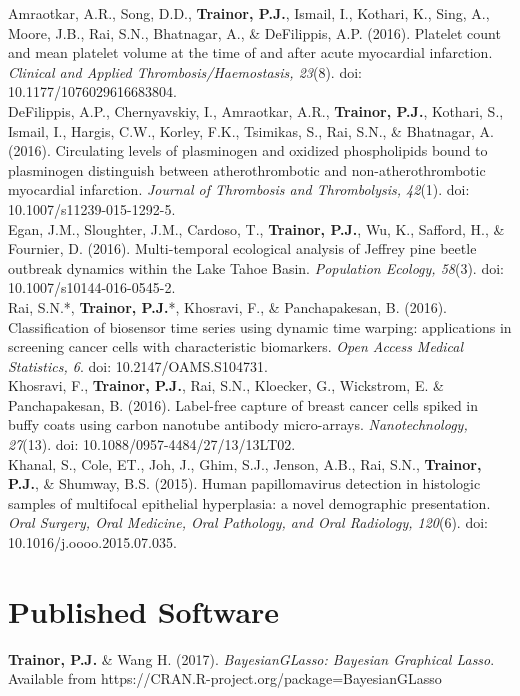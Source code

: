 \begin{DoubleSpace*}
{Amraotkar, A.R., Song, D.D., \textbf{Trainor, P.J.}, Ismail, I., Kothari, K., Sing, A., Moore, J.B., Rai, S.N., Bhatnagar, A., \& DeFilippis, A.P. (2016). Platelet count and mean platelet volume at the time of and after acute myocardial infarction. \emph{Clinical and Applied Thrombosis/Haemostasis, 23}(8). doi: 10.1177/1076029616683804.  \\

DeFilippis, A.P., Chernyavskiy, I., Amraotkar, A.R., \textbf{Trainor, P.J.}, 
Kothari, S., Ismail, I., Hargis, C.W., Korley, F.K., Tsimikas, S., Rai, S.N., \& Bhatnagar, A. (2016). Circulating levels of plasminogen and oxidized phospholipids bound to plasminogen distinguish between atherothrombotic and non-atherothrombotic myocardial infarction. \emph{Journal of Thrombosis and Thrombolysis, 42}(1). doi: 10.1007/s11239-015-1292-5.  \\

Egan, J.M., Sloughter, J.M., Cardoso, T., \textbf{Trainor, P.J.}, Wu, K., Safford, H., \& Fournier, D. (2016). Multi-temporal ecological analysis of Jeffrey pine beetle outbreak dynamics within the Lake Tahoe Basin. \emph{Population Ecology, 58}(3). doi: 10.1007/s10144-016-0545-2.  \\

Rai, S.N.*, \textbf{Trainor, P.J.}*, Khosravi, F., \& Panchapakesan, B.  (2016). Classification of biosensor time series using dynamic time warping: applications in screening cancer cells with characteristic biomarkers. \emph{Open Access Medical Statistics, 6}. doi: 10.2147/OAMS.S104731.  \\

Khosravi, F., \textbf{Trainor, P.J.}, Rai, S.N., Kloecker, G., Wickstrom, E. \& Panchapakesan, B. (2016). Label-free capture of breast cancer cells spiked in buffy coats using carbon nanotube antibody micro-arrays. \emph{Nanotechnology, 27}(13). doi: 10.1088/0957-4484/27/13/13LT02.  \\

Khanal, S., Cole, ET., Joh, J., Ghim, S.J., Jenson, A.B., Rai, S.N., \textbf{Trainor, P.J.}, \& Shumway, B.S. (2015). Human papillomavirus detection in histologic samples of multifocal epithelial hyperplasia: a novel demographic presentation. \emph{Oral Surgery, Oral Medicine, Oral Pathology, and Oral Radiology, 120}(6). doi: 10.1016/j.oooo.2015.07.035. 

\section*{Published Software}
\textbf{Trainor, P.J.} \& Wang H. (2017). \emph{BayesianGLasso: Bayesian Graphical Lasso}. Available from https://CRAN.R-project.org/package=BayesianGLasso

}
\end{DoubleSpace*}
